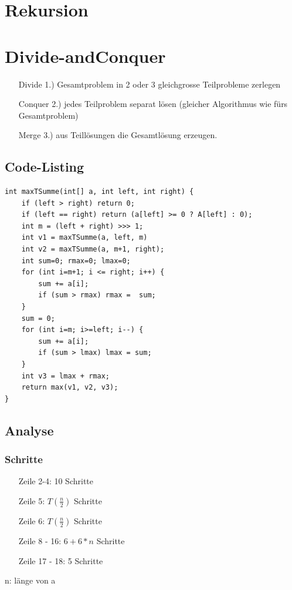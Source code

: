 \documentclass[a4paper,10pt]{article}
\begin{document}
\newpage
\section{Rekursion}


\newpage
\section{Divide-andConquer}
\begin{itemize}

	\item[Divide 1.)]
		Gesamtproblem in 2 oder 3 gleichgrosse Teilprobleme zerlegen
	\item[Conquer 2.)] 
		jedes Teilproblem separat l\"osen (gleicher Algorithmus wie f\"urs Gesamtproblem)
	\item[Merge 3.)] 
		aus Teill\"osungen die Gesamtl\"osung erzeugen.
\end{itemize}

\subsection{Code-Listing}
\begin{lstlisting}
int maxTSumme(int[] a, int left, int right) {
	if (left > right) return 0;
	if (left == right) return (a[left] >= 0 ? A[left] : 0);
	int m = (left + right) >>> 1;
	int v1 = maxTSumme(a, left, m)
	int v2 = maxTSumme(a, m+1, right);
	int sum=0; rmax=0; lmax=0;
	for (int i=m+1; i <= right; i++) {
		sum += a[i];
		if (sum > rmax) rmax =  sum;
	}
	sum = 0;
	for (int i=m; i>=left; i--) {
		sum += a[i];
		if (sum > lmax) lmax = sum;
	}
	int v3 = lmax + rmax;
	return max(v1, v2, v3);
}
\end{lstlisting}
\subsection{Analyse}
\subsubsection{Schritte}
\begin{itemize}
	\item[Zeile 2-4:] 10 Schritte
	\item[Zeile 5:] $T(\frac{n}{2})$ Schritte
	\item[Zeile 6:] $T(\frac{n}{2})$ Schritte
	\item[Zeile 8 - 16:] $6 + 6*n$ Schritte
	\item[Zeile 17 - 18:] 5 Schritte
\end{itemize}
n: l\"ange von a
\end{document}
